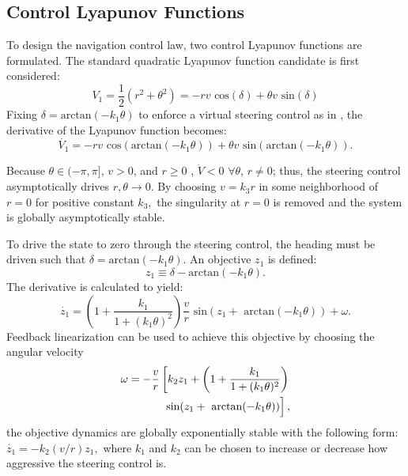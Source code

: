 \documentclass[conference]{IEEEtran}
\begin{document}
\subsection{Control Lyapunov Functions}
To design the navigation control law, two control Lyapunov functions are formulated. The standard quadratic Lyapunov function candidate is first considered:
\begin{equation}
V_1=\frac{1}{2}(r^2+\theta^2)=-r v \text{ cos}(\delta) + \theta v \text{ sin}(\delta)\label{v1}
\end{equation}
Fixing $\delta = \text{arctan}(-k_1\theta)$ to enforce a virtual steering control as in \cite{park2011}, the derivative of the Lyapunov function becomes:
\begin{equation}
\dot{V_1}=-r v \text{ cos}(\text{arctan}(-k_1\theta)) + \theta v \text{ sin}(\text{arctan}(-k_1\theta)).
\end{equation} 

Because $\theta\in (-\pi,\pi]$, $v>0$, and $r\geq 0$ , $\dot{V}<0$ $\forall \theta$, $r\neq0$; thus, the steering control asymptotically drives $r,\theta\to 0$. By choosing $v=k_3 r$ in some neighborhood of $r=0$ for positive constant $k_3,$ the singularity at $r=0$ is removed and the system is globally asymptotically stable.  

To drive the state to zero through the steering control, the heading must be driven such that $\delta = \text{arctan}(-k_1\theta).$ An objective $z_1$ is defined: 
\begin{equation}
z_1 \equiv \delta - \text{arctan}(-k_1\theta).
\label{z1}
\end{equation} The derivative is calculated to yield:
\begin{equation}
\dot{z_1}=\left( 1+\frac{k_1}{1+(k_1\theta)^2}\right) \frac{v}{r}\text{ sin}(z_1+\text{ arctan}(-k_1\theta))+\omega.
\end{equation}
Feedback linearization can be used to achieve this objective by choosing the angular velocity 
\begin{equation}
\begin{split}
\omega = -\frac{v}{r}\left[ k_2 z_1+\left( 1 + \frac{k_1}{1+(k_1\theta)^2} \right)\right.\\
\left. \vphantom{\frac{v}{r}} \text{sin}(z_1+\text{ arctan}(-k_1\theta))\right],
\end{split}
\end{equation}
the objective dynamics are globally exponentially stable with the following form: $\dot{z_1}=-k_2(v/r)z_1,$ where $k_1$ and $k_2$ can be chosen to increase or decrease how aggressive the steering control is.
\end{document}
